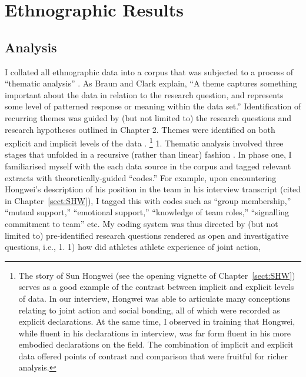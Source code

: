
\chapter{\label{app6:ethnoResults}Ethnographic Results}

                                                \begin{CJK}{UTF8}{gbsn}




\section{Analysis}
I collated all ethnographic data into a corpus that was subjected to a process of ``thematic analysis'' \citep{Braun2006}.  As Braun and Clark \textcite[10]{Braun2006} explain, ``A theme captures something important about the data in relation to the research question, and represents some level of patterned response or meaning within the data set.''  Identification of recurring themes was guided by (but not limited to) the research questions and research hypotheses outlined in Chapter 2.  Themes were identified on both explicit and implicit levels of the data \citep{Boyatzis1998}.  \footnote{The story of Sun Hongwei (see the opening vignette of Chapter~\ref{sect:SHW}) serves as a good example of the contrast between implicit and explicit levels of data.  In our interview, Hongwei was able to articulate many conceptions relating to joint action and social bonding, all of which were recorded as explicit declarations.  At the same time, I observed in training that Hongwei, while fluent in his declarations in interview, was far form fluent in his more embodied declarations on the field.  The combination of implicit and explicit data offered points of contrast and comparison that were fruitful for richer analysis.}
1. Thematic analysis involved three stages that unfolded in a recursive (rather than linear) fashion \citep{Braun2006}. In phase one, I familiarised myself with the each data source in the corpus and tagged relevant extracts with theoretically-guided ``codes.'' For example, upon encountering Hongwei's description of his position in the team in his interview transcript (cited in Chapter~\ref{sect:SHW}), I tagged this with codes such as ``group membership,'' ``mutual support,'' ``emotional support,'' ``knowledge of team roles,'' ``signalling commitment to team'' etc.  My coding system was thus directed by (but not limited to) pre-identified research questions rendered as open and investigative questions, i.e.,
  1. 1) how did athletes athlete experience of joint action,

\end{CJK}
